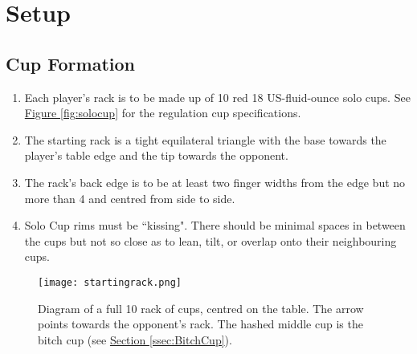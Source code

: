 \section{Setup}\label{sec:SETUP}
	\subsection{Cup Formation}\label{ssec:CupFormation}
		\begin{enumerate}[label=(\roman*), ref=\roman*]
            \item \label{sssec:CF,solocups} Each player's rack is to be made up of 10 red 18 US-fluid-ounce solo cups.
                See \hyperref[fig:solocup]{Figure \ref*{fig:solocup}} for the regulation cup specifications. 
            \item \label{sssec:CF,triangle} The starting rack is a tight equilateral triangle with the base towards the player's table edge and the tip towards the opponent. 
            \item \label{sssec:CF,position} The rack's back edge is to be at least two finger widths from the edge but no more than 4 and centred from side to side. 
            \item \label{sssec:CF,kissing} Solo Cup rims must be ``kissing". There should be minimal spaces in between the cups but not so close as to lean, tilt, or overlap onto their neighbouring cups. 
        \end{enumerate}
        \begin{figure}[H]%
            \centering
            \texttt{[image: startingrack.png]}
            \caption{Diagram of a full 10 rack of cups, centred on the table. The arrow points towards the opponent's rack. The hashed middle cup is the bitch cup (see \hyperref[ssec:BitchCup]{Section \ref*{ssec:BitchCup}}).}
            \label{fig:therack}
        \end{figure}
